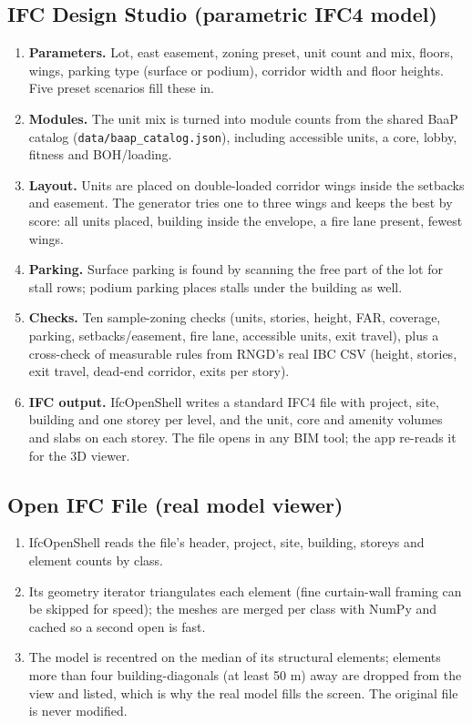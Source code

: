 \documentclass[10pt]{article}
\begin{document}
\subsection{IFC Design Studio (parametric IFC4 model)}
\begin{enumerate}
\item \textbf{Parameters.} Lot, east easement, zoning preset, unit count and mix, floors, wings, parking type (surface or podium), corridor width and floor heights. Five preset scenarios fill these in.
\item \textbf{Modules.} The unit mix is turned into module counts from the shared BaaP catalog (\texttt{data/baap\_catalog.json}), including accessible units, a core, lobby, fitness and BOH/loading.
\item \textbf{Layout.} Units are placed on double-loaded corridor wings inside the setbacks and easement. The generator tries one to three wings and keeps the best by score: all units placed, building inside the envelope, a fire lane present, fewest wings.
\item \textbf{Parking.} Surface parking is found by scanning the free part of the lot for stall rows; podium parking places stalls under the building as well.
\item \textbf{Checks.} Ten sample-zoning checks (units, stories, height, FAR, coverage, parking, setbacks/easement, fire lane, accessible units, exit travel), plus a cross-check of measurable rules from RNGD's real IBC CSV (height, stories, exit travel, dead-end corridor, exits per story).
\item \textbf{IFC output.} IfcOpenShell writes a standard IFC4 file with project, site, building and one storey per level, and the unit, core and amenity volumes and slabs on each storey. The file opens in any BIM tool; the app re-reads it for the 3D viewer.
\end{enumerate}

\subsection{Open IFC File (real model viewer)}
\begin{enumerate}
\item IfcOpenShell reads the file's header, project, site, building, storeys and element counts by class.
\item Its geometry iterator triangulates each element (fine curtain-wall framing can be skipped for speed); the meshes are merged per class with NumPy and cached so a second open is fast.
\item The model is recentred on the median of its structural elements; elements more than four building-diagonals (at least 50 m) away are dropped from the view and listed, which is why the real model fills the screen. The original file is never modified.
\end{enumerate}
\end{document}
